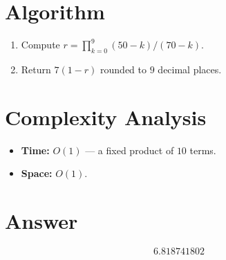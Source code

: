 \documentclass[12pt]{article}
\begin{document}
\section{Algorithm}
\begin{enumerate}
\item Compute $r = \prod_{k=0}^{9}(50-k)/(70-k)$.
\item Return $7(1 - r)$ rounded to $9$ decimal places.
\end{enumerate}

\section{Complexity Analysis}
\begin{itemize}
\item \textbf{Time:} $O(1)$ --- a fixed product of $10$ terms.
\item \textbf{Space:} $O(1)$.
\end{itemize}

\section{Answer}

\[
\boxed{6.818741802}
\]
\end{document}

